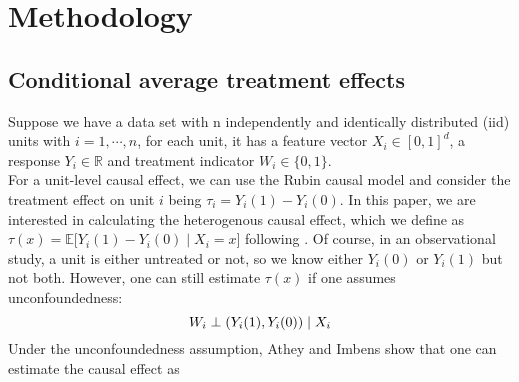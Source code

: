 \section{Methodology}

\subsection{Conditional average treatment effects}

Suppose we have a data set with n independently and identically distributed (iid) units with $ i = 1, \cdots, n$, for each unit, it has a feature vector $X_{i}  \in [0,1]^d$, a response $Y_{i} \in \mathbb{R}$ and treatment indicator $W_{i} \in \{0,1\}$.\\
For a unit-level causal effect, we can use the Rubin causal model and consider the treatment effect on unit $i$ being
$\tau_{i} = Y_{i}(1) - Y_{i}(0)$. 
In this paper, we are interested in calculating the heterogenous causal effect, which we define as
$\tau(x) = \mathbb{E} \big[{Y_{i}(1) - Y_{i}(0) \mid X_{i} = x}\big]$ following \cite{RePEc:ecm:emetrp:v:71:y:2003:i:4:p:1161-1189}.
Of course, in an observational study, a unit is either untreated or not, so we know either $Y_{i}(0)$ or $Y_{i}(1)$ but not both. However,  one can still estimate $\tau(x)$ if one assumes unconfoundedness:
\begin{equation} \label{eq:3}
W_{i} \perp \left( Y_{i}(1), Y_{i}(0) \right)  \mid X_{i}\\
\end{equation}
Under the unconfoundedness assumption, Athey and Imbens \cite{Athey} show that one can estimate the causal effect as 

